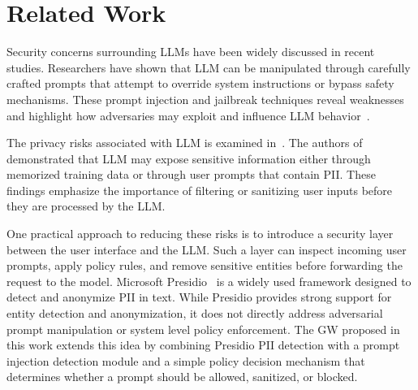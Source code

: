 \documentclass[conference]{IEEEtran}
\begin{document}
\section{Related Work}
\label{sec:relatedwork}

Security concerns surrounding LLMs have been widely discussed in recent studies. Researchers have shown that LLM can be manipulated through carefully crafted prompts that attempt to override system instructions or bypass safety mechanisms. These prompt injection and jailbreak techniques reveal weaknesses and highlight how adversaries may exploit and influence LLM behavior~\cite{wei2023jailbreak,perez2022redteaming}. 

The privacy risks associated with LLM is examined  in~\cite{carlini2021extracting}. The authors of ~\cite{carlini2021extracting} demonstrated that LLM may expose sensitive information either through memorized training data or through user prompts that contain PII. These findings emphasize the importance of filtering or sanitizing user inputs before they are processed by the LLM.

One practical approach to reducing these risks is to introduce a security layer between the user interface and the LLM. Such a layer can inspect incoming user prompts, apply policy rules, and remove sensitive entities before forwarding the request to the model. Microsoft Presidio~\cite{presidio2023} is a widely used framework designed to detect and anonymize PII in text. While Presidio provides strong support for entity detection and anonymization, it does not directly address adversarial prompt manipulation or system level policy enforcement. The GW proposed in this work extends this idea by combining Presidio PII detection with a prompt injection detection module and a simple policy decision mechanism that determines whether a prompt should be allowed, sanitized, or blocked.
\end{document}
